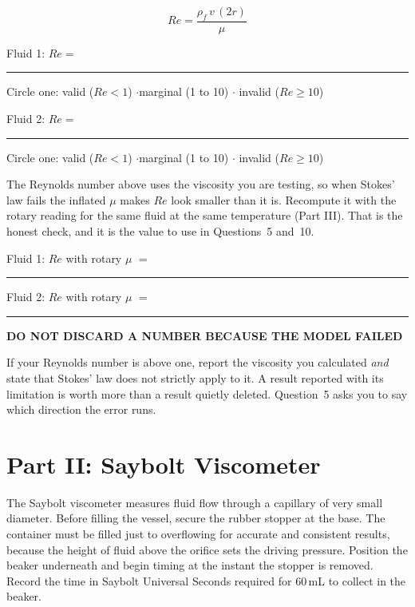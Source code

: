 \documentclass[11pt,a4paper]{article}
\newcommand{\bl}{\rule[-0.35em]{1.6cm}{0.4pt}}
\newcommand{\noteh}[1]{{\footnotesize\bfseries\sffamily\color{ink3}\MakeUppercase{#1}}\par\vspace{2pt}}
\begin{document}
\begin{equation}
  \mathit{Re} = \frac{\rho_f\,v\,(2r)}{\mu}
\end{equation}

\noindent Fluid 1: $\mathit{Re} =$ \bl \quad Circle one:\quad
valid ($\mathit{Re}<1$) \quad$\cdot$\quad marginal (1 to 10) \quad$\cdot$\quad
invalid ($\mathit{Re}\geq10$) \par
\smallskip
\noindent Fluid 2: $\mathit{Re} =$ \bl \quad Circle one:\quad
valid ($\mathit{Re}<1$) \quad$\cdot$\quad marginal (1 to 10) \quad$\cdot$\quad
invalid ($\mathit{Re}\geq10$) \par

\smallskip
\noindent The Reynolds number above uses the viscosity you are testing, so when Stokes' law fails the
inflated $\mu$ makes $\mathit{Re}$ look smaller than it is. Recompute it with the rotary reading for
the same fluid at the same temperature (Part III). That is the honest check, and it is the value to
use in Questions~5 and~10.

\smallskip
\noindent Fluid 1: $\mathit{Re}$ with rotary $\mu$ $=$ \bl \qquad Fluid 2: $\mathit{Re}$ with rotary $\mu$ $=$ \bl \par

\begin{labnote}
\noteh{Do not discard a number because the model failed}
If your Reynolds number is above one, report the viscosity you calculated \emph{and} state that
Stokes' law does not strictly apply to it. A result reported with its limitation is worth more
than a result quietly deleted. Question~5 asks you to say which direction the error runs.
\end{labnote}

\section{Part II: Saybolt Viscometer}
The Saybolt viscometer measures fluid flow through a capillary of very small diameter. Before
filling the vessel, secure the rubber stopper at the base. The container must be filled just to
overflowing for accurate and consistent results, because the height of fluid above the orifice
sets the driving pressure. Position the beaker underneath and begin timing at the instant the
stopper is removed. Record the time in Saybolt Universal Seconds required for 60\,mL to collect
in the beaker.
\end{document}
